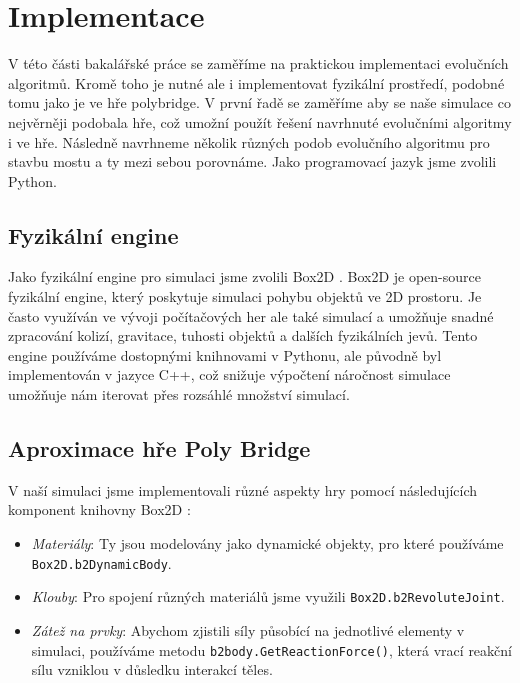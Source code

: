 \chapter{Implementace}

V této části bakalářské práce se zaměříme na praktickou implementaci evolučních algoritmů. Kromě toho je nutné ale i implementovat fyzikální prostředí, podobné tomu jako je ve hře polybridge. V první řadě se zaměříme aby se naše simulace co nejvěrněji podobala hře, což umožní použít řešení navrhnuté evolučními algoritmy i ve hře. Následně navrhneme několik různých podob evolučního algoritmu pro stavbu mostu a ty mezi sebou porovnáme. Jako programovací jazyk jsme zvolili Python.


\section{Fyzikální engine}

Jako fyzikální engine pro simulaci jsme zvolili Box2D \citet{box2d}. Box2D je open-source fyzikální engine, který poskytuje simulaci pohybu objektů ve 2D prostoru. Je často využíván ve vývoji počítačových her ale také simulací a umožňuje snadné zpracování kolizí, gravitace, tuhosti objektů a dalších fyzikálních jevů. Tento engine používáme dostopnými knihnovami v Pythonu, ale původně byl implementován v jazyce C++, což snižuje výpočtení náročnost simulace umožňuje nám iterovat přes rozsáhlé množství simulací.

\section{Aproximace hře Poly Bridge}

V naší simulaci jsme implementovali různé aspekty hry pomocí následujících komponent knihovny Box2D \citet{b2docs}:

\begin{itemize}
    \item \emph{Materiály}: Ty jsou modelovány jako dynamické objekty, pro které používáme \texttt{Box2D.b2DynamicBody}.
    \item \emph{Klouby}: Pro spojení různých materiálů jsme využili \texttt{Box2D.b2RevoluteJoint}.
    \item \emph{Zátež na prvky}: Abychom zjistili síly působící na jednotlivé elementy v simulaci, používáme metodu \texttt{b2body.GetReactionForce()}, která vrací reakční sílu vzniklou v důsledku interakcí těles.
\end{itemize}

